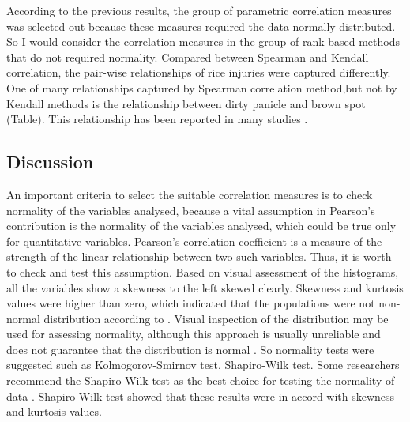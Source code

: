 

According to the previous results, the group of parametric correlation measures was selected out because these measures required the data normally distributed. So I would consider the correlation measures in the group of rank based methods that do not required normality. Compared between Spearman and Kendall correlation, the pair-wise relationships of rice injuries were captured differently. One of many relationships captured by Spearman correlation method,but not by Kendall methods is the relationship between dirty panicle and brown spot (Table). This relationship has been reported in many studies \citep{Ou_1985_Rice, Barnwal_2013_Review}.

\subsection{Discussion}

An important criteria to select the suitable correlation measures is to check normality of the variables analysed, because a vital assumption in Pearson’s contribution is the normality of the variables analysed, which could be true only for quantitative variables. Pearson’s correlation coefficient is a measure of the strength of the linear relationship between two such variables. Thus, it is worth to check and test this assumption. Based on visual assessment of the histograms, all the variables show a skewness to the left skewed clearly. Skewness and kurtosis values were higher than zero, which indicated that the populations were not non-normal distribution  according to \citet{Doane_2011_Measuring}. Visual inspection of the distribution may be used for assessing normality, although this approach is usually unreliable and does not guarantee that the distribution is normal \citep{Ghasemi_2012_Normality}. So normality tests were suggested such as Kolmogorov-Smirnov test, Shapiro-Wilk test. Some researchers recommend the Shapiro-Wilk test as the best choice for testing the normality of data \citep{Peat_2005_Guide}. Shapiro-Wilk test showed that these results were in accord with skewness and kurtosis values.

